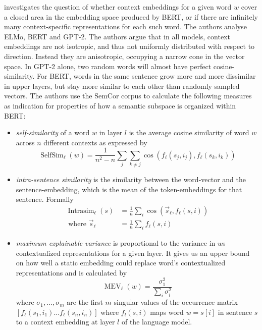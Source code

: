 \documentclass[a4paper,12pt,twoside,openright]{report}
\begin{document}
\cite{ethayarajh19} investigates the question of whether context embeddings for a given word $w$ cover a closed area in the embedding space produced by BERT, or if there are infinitely many context-specific representations for each such word.
The authors analyse ELMo, BERT and GPT-2.
The authors argue that in all models, context embeddings are not isotropic, and thus not uniformly distributed with respect to direction.
Instead they are anisotropic, occupying a narrow cone in the vector space.
In GPT-2 alone, two random words will almost have perfect cosine-similarity.
For BERT, words in the same sentence grow more and more dissimilar in upper layers, but stay more similar to each other than randomly sampled vectors.
The authors use the SemCor corpus to calculate the following measures as indication for properties of how a semantic subspace is organized within BERT: \\

\begin{itemize}
\item \textit{self-similarity} of a word $w$ in layer $l$ is the average cosine similarity of word $w$ across $n$ different contexts as expressed by 
$$
\operatorname{SelfSim}_{\ell}(w)=\frac{1}{n^{2}-n} \sum_{j} \sum_{k \neq j} \cos \left(f_{\ell}\left(s_{j}, i_{j}\right), f_{\ell}\left(s_{k}, i_{k}\right)\right)
$$
\item \textit{intra-sentence similarity} is the similarity between the word-vector and the sentence-embedding, which is the mean of the token-embeddings for that sentence. 
Formally
$$
\begin{aligned} \operatorname{Intrasim}_{\ell}(s) &=\frac{1}{n} \sum_{i} \cos \left(\vec{s}_{\ell}, f_{\ell}(s, i)\right) \\ \text { where } \vec{s}_{\ell} &=\frac{1}{n} \sum_{i} f_{\ell}(s, i) \end{aligned}
$$
\item \textit{maximum explainable variance} is proportional to the variance in $w$s contextualized representations for a given layer.
It gives us an upper bound on how well a static embedding could replace word's contextualized representations and is calculated by 
$$
\operatorname{MEV}_{\ell}(w)=\frac{\sigma_{1}^{2}}{\sum_{i} \sigma_{i}^{2}}
$$
where $\sigma_1, \ldots, \sigma_m$ are the first $m$ singular values of the occurrence matrix $
\left[f_{\ell}\left(s_{1}, i_{1}\right) \ldots f_{\ell}\left(s_{n}, i_{n}\right)\right]
$ where $f_l(s, i)$ maps word $w = s[i]$ in sentence $s$ to a context embedding at layer $l$ of the language model.
\end{itemize}
\end{document}
